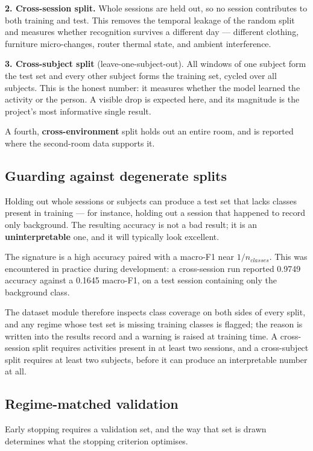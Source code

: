 \textbf{2. Cross-session split.} Whole sessions are held out, so no session
contributes to both training and test. This removes the temporal leakage of
the random split and measures whether recognition survives a different day
--- different clothing, furniture micro-changes, router thermal state, and
ambient interference.

\textbf{3. Cross-subject split} (leave-one-subject-out). All windows of one
subject form the test set and every other subject forms the training set,
cycled over all subjects. This is the honest number: it measures whether the
model learned the activity or the person. A visible drop is expected here,
and its magnitude is the project's most informative single result.

A fourth, \textbf{cross-environment} split holds out an entire room, and is
reported where the second-room data supports it.

\subsection{Guarding against degenerate splits}

Holding out whole sessions or subjects can produce a test set that lacks
classes present in training --- for instance, holding out a session that
happened to record only background. The resulting accuracy is not a bad
result; it is an \textbf{uninterpretable} one, and it will typically look
excellent.

The signature is a high accuracy paired with a macro-F1 near $1/n_{classes}$.
This was encountered in practice during development: a cross-session run
reported 0.9749 accuracy against a 0.1645 macro-F1, on a test session
containing only the background class.

The dataset module therefore inspects class coverage on both sides of every
split, and any regime whose test set is missing training classes is flagged;
the reason is written into the results record and a warning is raised at
training time. A cross-session split requires activities present in at least
two sessions, and a cross-subject split requires at least two subjects,
before it can produce an interpretable number at all.

\subsection{Regime-matched validation}

Early stopping requires a validation set, and the way that set is drawn
determines what the stopping criterion optimises.

